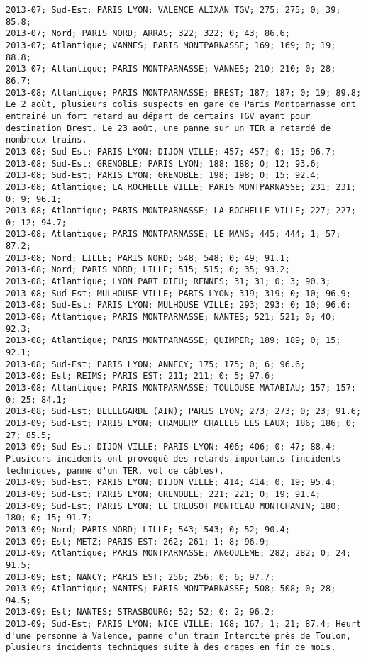 \documentclass{article}
\begin{document}
\begin{Verbatim}[commandchars=\\\{\}]
2013-07; Sud-Est; PARIS LYON; VALENCE ALIXAN TGV; 275; 275; 0; 39; 85.8; 
2013-07; Nord; PARIS NORD; ARRAS; 322; 322; 0; 43; 86.6; 
2013-07; Atlantique; VANNES; PARIS MONTPARNASSE; 169; 169; 0; 19; 88.8; 
2013-07; Atlantique; PARIS MONTPARNASSE; VANNES; 210; 210; 0; 28; 86.7; 
2013-08; Atlantique; PARIS MONTPARNASSE; BREST; 187; 187; 0; 19; 89.8; Le 2 août, plusieurs colis suspects en gare de Paris Montparnasse ont entrainé un fort retard au départ de certains TGV ayant pour destination Brest. Le 23 août, une panne sur un TER a retardé de nombreux trains.
2013-08; Sud-Est; PARIS LYON; DIJON VILLE; 457; 457; 0; 15; 96.7; 
2013-08; Sud-Est; GRENOBLE; PARIS LYON; 188; 188; 0; 12; 93.6; 
2013-08; Sud-Est; PARIS LYON; GRENOBLE; 198; 198; 0; 15; 92.4; 
2013-08; Atlantique; LA ROCHELLE VILLE; PARIS MONTPARNASSE; 231; 231; 0; 9; 96.1; 
2013-08; Atlantique; PARIS MONTPARNASSE; LA ROCHELLE VILLE; 227; 227; 0; 12; 94.7; 
2013-08; Atlantique; PARIS MONTPARNASSE; LE MANS; 445; 444; 1; 57; 87.2; 
2013-08; Nord; LILLE; PARIS NORD; 548; 548; 0; 49; 91.1; 
2013-08; Nord; PARIS NORD; LILLE; 515; 515; 0; 35; 93.2; 
2013-08; Atlantique; LYON PART DIEU; RENNES; 31; 31; 0; 3; 90.3; 
2013-08; Sud-Est; MULHOUSE VILLE; PARIS LYON; 319; 319; 0; 10; 96.9; 
2013-08; Sud-Est; PARIS LYON; MULHOUSE VILLE; 293; 293; 0; 10; 96.6; 
2013-08; Atlantique; PARIS MONTPARNASSE; NANTES; 521; 521; 0; 40; 92.3; 
2013-08; Atlantique; PARIS MONTPARNASSE; QUIMPER; 189; 189; 0; 15; 92.1; 
2013-08; Sud-Est; PARIS LYON; ANNECY; 175; 175; 0; 6; 96.6; 
2013-08; Est; REIMS; PARIS EST; 211; 211; 0; 5; 97.6; 
2013-08; Atlantique; PARIS MONTPARNASSE; TOULOUSE MATABIAU; 157; 157; 0; 25; 84.1; 
2013-08; Sud-Est; BELLEGARDE (AIN); PARIS LYON; 273; 273; 0; 23; 91.6; 
2013-09; Sud-Est; PARIS LYON; CHAMBERY CHALLES LES EAUX; 186; 186; 0; 27; 85.5; 
2013-09; Sud-Est; DIJON VILLE; PARIS LYON; 406; 406; 0; 47; 88.4; Plusieurs incidents ont provoqué des retards importants (incidents techniques, panne d'un TER, vol de câbles).
2013-09; Sud-Est; PARIS LYON; DIJON VILLE; 414; 414; 0; 19; 95.4; 
2013-09; Sud-Est; PARIS LYON; GRENOBLE; 221; 221; 0; 19; 91.4; 
2013-09; Sud-Est; PARIS LYON; LE CREUSOT MONTCEAU MONTCHANIN; 180; 180; 0; 15; 91.7; 
2013-09; Nord; PARIS NORD; LILLE; 543; 543; 0; 52; 90.4; 
2013-09; Est; METZ; PARIS EST; 262; 261; 1; 8; 96.9; 
2013-09; Atlantique; PARIS MONTPARNASSE; ANGOULEME; 282; 282; 0; 24; 91.5; 
2013-09; Est; NANCY; PARIS EST; 256; 256; 0; 6; 97.7; 
2013-09; Atlantique; NANTES; PARIS MONTPARNASSE; 508; 508; 0; 28; 94.5; 
2013-09; Est; NANTES; STRASBOURG; 52; 52; 0; 2; 96.2; 
2013-09; Sud-Est; PARIS LYON; NICE VILLE; 168; 167; 1; 21; 87.4; Heurt d'une personne à Valence, panne d'un train Intercité près de Toulon, plusieurs incidents techniques suite à des orages en fin de mois.

\end{Verbatim}
\end{document}
